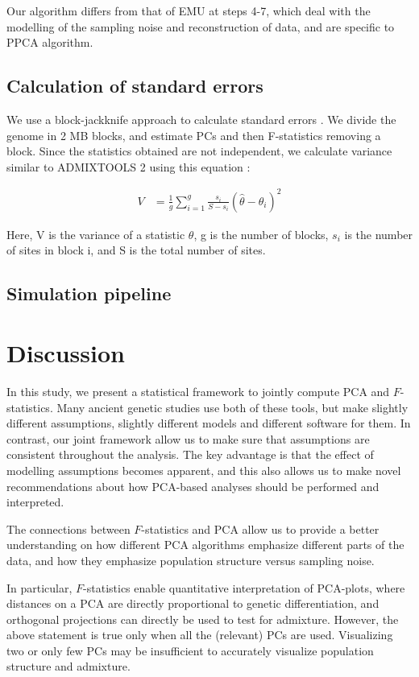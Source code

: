 \documentclass[12pt, letterpaper]{article}
\begin{document}
Our algorithm differs from that of EMU at steps 4-7, which deal with the modelling of the sampling noise and reconstruction of data, and are specific to PPCA algorithm.

\subsection{Calculation of standard errors}

We use a block-jackknife approach to calculate standard errors \cite{maier_limits_2022}. We divide the genome in 2 MB blocks, and estimate PCs and then F-statistics removing a block. Since the statistics obtained are not independent, we calculate variance similar to ADMIXTOOLS 2 using this equation \cite{maier_limits_2022}:

\begin{align}\label{eq:bjk_var}
V &= \frac{1}{g} \sum_{i=1}^g \frac{s_i}{S-s_i} (\hat{\theta} - \theta_i)^2
\end{align}

Here, V is the variance of a statistic $\theta$, g is the number of blocks, $s_i$ is the number of sites in block i, and S is the total number of sites.

\subsection{Simulation pipeline}

\section{Discussion}
In this study, we present a statistical framework to jointly compute PCA and $F$-statistics. Many ancient genetic studies use both of these tools, but make slightly different assumptions, slightly different models and different software for them. In contrast, our joint framework allow us to make sure that assumptions are consistent throughout the analysis. The key advantage is that the effect of modelling assumptions becomes apparent, and this also allows us to make novel recommendations about how PCA-based analyses should be performed and interpreted.

The connections between $F$-statistics and PCA allow us to provide a better understanding on how different PCA algorithms emphasize different parts of the data, and how they emphasize population structure versus sampling noise.

In particular, $F$-statistics enable quantitative interpretation of PCA-plots, where distances on a PCA are directly proportional to genetic differentiation, and orthogonal projections can directly be used to test for admixture.
However, the above statement is true only when all the (relevant) PCs are used. Visualizing two or only few PCs may be insufficient to accurately visualize population structure and admixture. 
\end{document}
